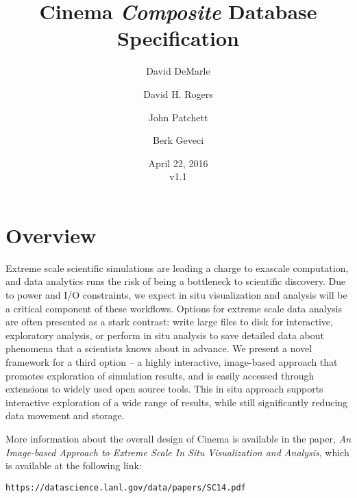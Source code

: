 \documentclass{article}
\newcommand{\CinemaSpecVersion} {v1.1}
\newcommand{\Composite} {\textit{Composite}\xspace}
\begin{document}
\title{Cinema \Composite Database Specification}
\date{April 22, 2016 \\ \CinemaSpecVersion}
\author[**]{David DeMarle}
\author[*]{David H. Rogers}
\author[*]{John Patchett}
\author[**]{Berk Geveci}

\renewcommand\Authands{ and }



\maketitle
{}


\section{Overview}
Extreme scale scientific simulations are leading a charge to exascale computation, and data analytics runs the risk of being a bottleneck to scientific discovery. Due to power and I/O constraints, we expect in situ visualization and analysis will be a critical component of these workflows. Options for extreme scale data analysis are often presented as a stark contrast: write large files to disk for interactive, exploratory analysis, or perform in situ analysis to save detailed data about phenomena that a scientists knows about in advance. We present a novel framework for a third option – a highly interactive, image-based approach that promotes exploration of simulation results, and is easily accessed through extensions to widely used open source tools. This in situ approach supports interactive exploration of a wide range of results, while still significantly reducing data movement and storage.

More information about the overall design of Cinema is available in the paper, \textit{An Image-based Approach to Extreme Scale In Situ Visualization and Analysis}\cite{cinemaSC14}, which is available at the following link:

\begin{center}
\texttt{https://datascience.lanl.gov/data/papers/SC14.pdf}
\end{center}
\end{document}
